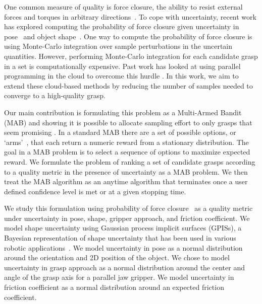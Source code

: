 \documentclass[10pt, conference]{ieeeconf}      %
\begin{document}
One common measure of quality is force closure, the ability to resist external forces and torques in arbitrary directions~\cite{li1988task}. To cope with uncertainty, recent work has explored computing the probability of  force closure given uncertainty in pose~\cite{christopoulos2007handling, kim2012physically, weisz2012pose} and object shape~\cite{kehoe2012estimating, mahler2015gp}.
One way to compute the probability of force closure is using Monte-Carlo integration over sample perturbations in the uncertain quantities\cite{christopoulos2007handling, kim2012physically, weisz2012pose, kehoe2012toward}. However, performing Monte-Carlo integration for each candidate grasp in a set is computationally expensive.  Past work has looked at using parallel programming in the cloud to overcome this hurdle \cite{kehoe2012estimating,kehoe2012toward,kehoe2015survey}.
In this work, we aim to extend these cloud-based methods by reducing the number of samples needed to converge to a high-quality grasp.  

Our main contribution is formulating this problem as  a Multi-Armed Bandit (MAB) and showing it is possible to allocate sampling effort to only grasps that seem promising \cite{barto1998reinforcement, lai1985asymptotically, robbins1985some}. In a standard MAB there are a set of possible options, or `arms'~\cite{barto1998reinforcement}, that each return a numeric reward from a stationary distribution. The goal in a MAB problem is to  select a sequence of options to maximize expected reward. We formulate the problem of ranking a set of candidate grasps according to a quality metric in the presence of uncertainty as a MAB problem. We then treat the MAB algorithm as an anytime algorithm that terminates once a user defined confidence level is met or at a given stopping time. 

We study this formulation using probability of force closure~\cite{christopoulos2007handling, weisz2012pose, kehoe2012toward} as a quality metric under uncertainty in pose, shape, gripper approach, and friction coefficient. 
We model shape uncertainty using Gaussian process implicit surfaces (GPISs), a Bayesian representation of shape uncertainty that has been used in various robotic applications~\cite{dragiev2011, hollinger2013}. 
We model uncertainty in pose as a normal distribution around the orientation and 2D position of the object.
We chose to model uncertainty in grasp approach as a normal distribution around the center and angle of the grasp axis for a parallel jaw gripper. We model uncertainty in friction coefficient as a normal distribution around an expected friction coefficient.
\end{document}

